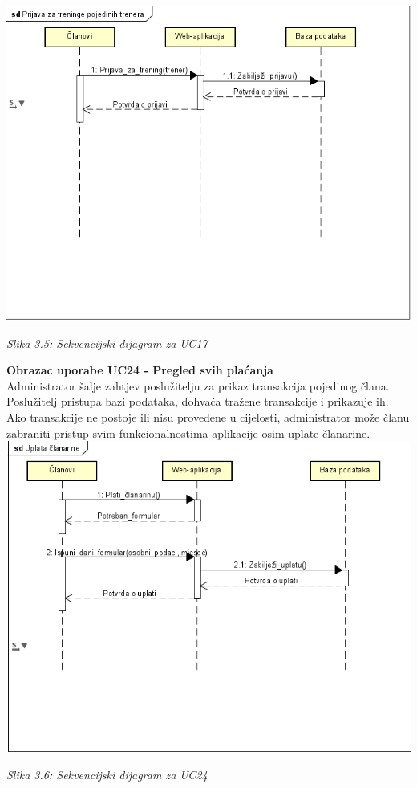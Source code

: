 \documentclass{article}
\begin{document}
		\eject
		\includegraphics[width=\columnwidth]{prijava_za_treninge}
		\begin{center}
			\textit{Slika 3.5: Sekvencijski dijagram za UC17}
		\end{center}
		\eject
		\textbf{Obrazac uporabe UC24 - Pregled svih plaćanja}\\
		Administrator šalje zahtjev poslužitelju za prikaz transakcija pojedinog člana. Poslužitelj pristupa bazi podataka, dohvaća tražene transakcije i prikazuje ih. Ako transakcije ne postoje ili nisu provedene u cijelosti, administrator može članu zabraniti pristup svim funkcionalnostima aplikacije osim uplate članarine.
		\eject
		\includegraphics[width=\columnwidth]{uplata_clanarine}
		\begin{center}
			\textit{Slika 3.6: Sekvencijski dijagram za UC24}
		\end{center}
		\eject
\end{document}

